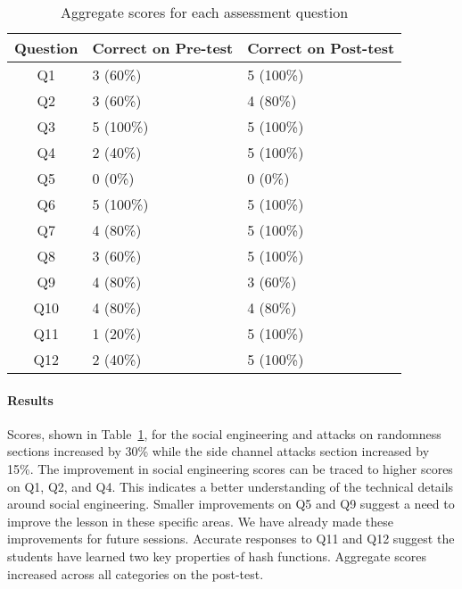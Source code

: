 \begin{table}
  \centering
  \scriptsize
  \begin{tabular}{c | l | l}
Question &  Correct on Pre-test   & Correct on Post-test \\
\hline
Q1   & 3 (60\%)  & 5 (100\%) \\
Q2   & 3 (60\%)  & 4 (80\%)  \\
Q3   & 5 (100\%) & 5 (100\%) \\
Q4   & 2 (40\%)  & 5 (100\%) \\
Q5   & 0 (0\%)   & 0 (0\%)   \\
Q6   & 5 (100\%) & 5 (100\%) \\
Q7   & 4 (80\%)  & 5 (100\%) \\
Q8   & 3 (60\%)  & 5 (100\%) \\
Q9   & 4 (80\%)  & 3 (60\%)  \\
Q10  & 4 (80\%)  & 4 (80\%)  \\
Q11  & 1 (20\%)  & 5 (100\%) \\
Q12  & 2 (40\%)  & 5 (100\%) \\
\end{tabular}

\caption{Aggregate scores for each assessment question}
\label{fig:results}
\end{table}

\paragraph{Results}
Scores, shown in Table~\ref{fig:results}, for the social engineering and attacks on randomness sections
increased by 30\% while the side channel attacks section increased by
15\%.
The improvement in social engineering scores can be traced to
higher scores on
Q1, Q2, and Q4.
This indicates a better understanding of the technical details
around social engineering.
Smaller improvements on Q5 and Q9 suggest a need to improve the lesson in
these specific areas.  We have already made these improvements for future
sessions.
Accurate responses to Q11 and Q12
suggest the students have learned two
key properties of hash functions.
Aggregate scores increased across all categories on the post-test.


